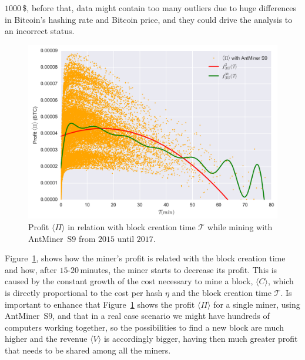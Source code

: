 \documentclass[USenglish]{uit-thesis}
\begin{document}
$1000$\,\$, before that, data might contain too many
outliers due to huge differences in Bitcoin's hashing
rate and Bitcoin price, and they could drive the
analysis to an incorrect status.
\begin{figure}[h]
	\centering
	\includegraphics[width=1\textwidth]{img/profit_creation_time}
	\caption{Profit $\langle \Pi \rangle$ in relation with block creation time $\mathcal{T}$
		while mining with AntMiner~S$9$ from
		$2015$ until $2017$.}
	\label{fig:profit_creation_time}
\end{figure}
Figure~\ref{fig:profit_creation_time}, shows how the
miner's profit is related with the block creation time and how,
after $15$-$20$\,minutes, the miner starts to decrease its profit.
This is caused by the constant growth of the cost
necessary to mine a block, $\langle C \rangle$,
which is directly proportional to the cost per hash $\eta$ and
the block creation time $\mathcal{T}$.
Is important to enhance that Figure~\ref{fig:profit_creation_time} shows
the profit $\langle \Pi \rangle$ for a single miner,
using AntMiner~S$9$, and that in a real
case scenario we might have hundreds of
computers working together, so the possibilities
to find a new block are much higher and
the revenue $\langle V \rangle$ is
accordingly bigger, having then
much greater profit that needs to be shared
among all the miners.
\end{document}
